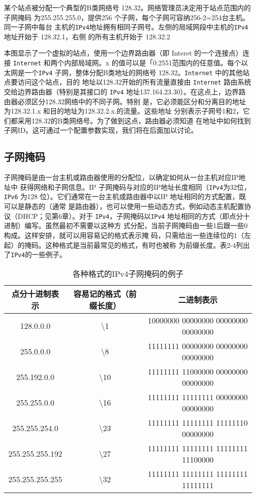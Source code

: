 某个站点被分配一个典型的B类网络号 128.32。网络管理员决定用于站点范围内的子网掩码
为255.255.255.0，提供256 个子网，每个子网可容纳256-2=254台主机。同一子网中每台
主机的\verb|IPv4|地址拥有相同子网号。左侧的局域网段中主机的\verb|IPv4|地址开始于 128.32.1，右侧
的所有主机开始于 128.32.2

本图显示了一个虚拟的站点，使用一个边界路由器（即 Interet 的一个连接点）连接
\verb|Internet| 和两个内部局域网。x 的值可以是「0.2551范围内的任意值。每个以太网是一个\verb|IPv4|
子网，整体分配B类地址的网络号 128.32。\verb|Internet| 中的其他站点要访问这个站点，目的
地址以128.32开始的所有流量直接由 \verb|Internet| 路由系统交给边界路由器（特别是其接口的
\verb|IPv4| 地址137.164.23.30）。在这点上，边界路由器必须区分128.32网络中的不同子网。特别
是，它必须能区分和分离目的地址为128.32.1.x 和目的地址为128.32.2.x.的流量。这些地址
分别表示子网号1和2，它们都采用128.32的B类网络号。为了做到这点，路由器必须知道
在地址中如何找到子网ID。这可通过一个配置参数实现，我们将在后面加以讨论。

\subsection{子网掩码}
子网掩码是由一台主机或路由器使用的分配位，以确定如何从一台主机对应IP地址中
获得网络和子网信息。IP 子网掩码与对应的IP地址长度相同（\verb|IPv4|为32位，\verb|IPv6| 为128
位）。它们通常在一台主机或路由器中以IP 地址相同的方式配置，既可以是静态的（通常
是路由器），也可以使用一些动态方式，例如动态主机配置协议（DHCP；见第6章）。对于
\verb|IPv4|，子网掩码以\verb|IPv4| 地址相同的方式（即点分十进制）编写。虽然最初不需要以这种方
式分配，当前子网掩码由一些1后跟一些0构成。这样安排，就可以用容易记的格式表示掩
码，只需给出一些连续位的1（左起）的掩码。这种格式是当前最常见的格式，有时也被称
为前缀长度。表2-4列出了\verb|IPv4|的一些例子。

\begin{table}[H]
    \centering
    \caption{各种格式的IPv4子网掩码的例子}
    \begin{tabular}{c|c|c}
        \hline
        点分十进制表示	  &	容易记的格式（前缀长度）	&	    二进制表示	     \\ \hline
        128.0.0.0	    &   \textbackslash 1	    &	10000000 00000000 00000000 00000000	 \\ \hline
        255.0.0.0	    &	\textbackslash 8	    &	11111111 00000000 00000000 00000000	 \\ \hline
        255.192.0.0	    &	\textbackslash 10	&	11111111 11000000 00000000 00000000	 \\ \hline
        255.255.0.0	    &	\textbackslash 16	&	11111111 11111111 00000000 00000000	 \\ \hline
        255.255.254.0	&	\textbackslash 23	&	11111111 11111111 11111110 00000000	 \\ \hline
        255.255.255.192	&	\textbackslash 27	&	11111111 11111111 11111111 11100000	 \\ \hline
        255.255.255.255	&	\textbackslash 32	&	11111111 11111111 11111111 11111111	 \\ \hline
    \end{tabular}
\end{table}

